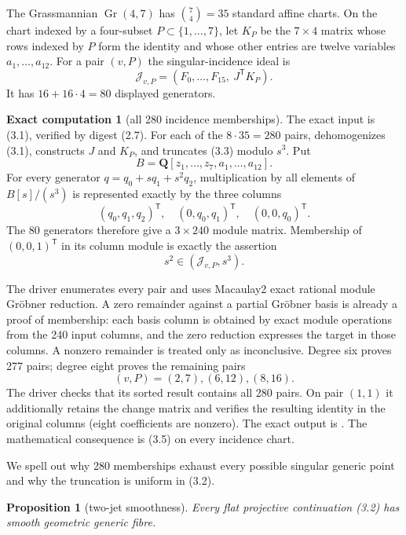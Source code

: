 \documentclass[11pt]{article}
\newtheorem{proposition}[theorem]{Proposition}
\theoremstyle{definition}
\newtheorem{computation}[theorem]{Exact computation}
\theoremstyle{remark}
\newcommand{\QQ}{\mathbf Q}
\newcommand{\Gr}{\operatorname{Gr}}
\begin{document}
The Grassmannian $\Gr(4,7)$ has $\binom74=35$ standard affine charts.  On the
chart indexed by a four-subset $P\subset\{1,\ldots,7\}$, let $K_P$ be the
$7\times4$ matrix whose rows indexed by $P$ form the identity and whose other
entries are twelve variables $a_1,\ldots,a_{12}$.  For a pair $(v,P)$ the
singular-incidence ideal is
\[
 \mathcal J_{v,P}=(F_0,\ldots,F_{15},\ J^{\mathsf T}K_P).       \tag{3.3}
\]
It has $16+16\cdot4=80$ displayed generators.

\begin{computation}[all 280 incidence memberships]\label{comp:incidence}
The exact input is (3.1), verified by digest (2.7).  For each of the
$8\cdot35=280$ pairs, 
dehomogenizes (3.1), constructs $J$ and $K_P$, and truncates (3.3) modulo
$s^3$.  Put
\[
 B=\QQ[z_1,\ldots,z_7,a_1,\ldots,a_{12}].
\]
For every generator $q=q_0+sq_1+s^2q_2$, multiplication by all elements of
$B[s]/(s^3)$ is represented exactly by the three columns
\[
 (q_0,q_1,q_2)^{\mathsf T},\quad(0,q_0,q_1)^{\mathsf T},\quad
 (0,0,q_0)^{\mathsf T}.                                      \tag{3.4}
\]
The 80 generators therefore give a $3\times240$ module matrix.  Membership of
$(0,0,1)^{\mathsf T}$ in its column module is exactly the assertion
\[
 s^2\in(\mathcal J_{v,P},s^3).                                \tag{3.5}
\]

The driver  enumerates every pair and
uses Macaulay2 exact rational module Gr\"obner reduction.  A zero remainder
against a partial Gr\"obner basis is already a proof of membership: each
basis column is obtained by exact module operations from the 240 input
columns, and the zero reduction expresses the target in those columns.  A
nonzero remainder is treated only as inconclusive.  Degree six proves 277
pairs; degree eight proves the remaining pairs
\[
 (v,P)=(2,7),(6,12),(8,16).                                   \tag{3.6}
\]
The driver checks that its sorted result contains all 280 pairs.  On pair
$(1,1)$ it additionally retains the change matrix and verifies the resulting
identity in the original columns (eight coefficients are nonzero).  The exact
output is .  The mathematical
consequence is (3.5) on every incidence chart.
\end{computation}

We spell out why 280 memberships exhaust every possible singular generic
point and why the truncation is uniform in (3.2).

\begin{proposition}[two-jet smoothness]\label{prop:smooth}
Every flat projective continuation (3.2) has smooth geometric generic fibre.
\end{proposition}
\end{document}
